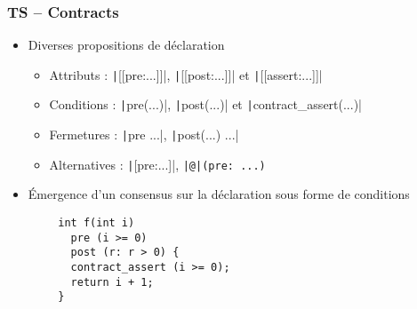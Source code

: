 \documentclass[C++.tex]{subfiles}
\begin{document}
\begin{frame}[fragile]
	\frametitle{TS -- Contracts}
	\begin{itemize}
		\item Diverses propositions de déclaration
		\begin{itemize}
			\item Attributs : \texttt|[[pre:...]]|, \texttt|[[post:...]]| et  \texttt|[[assert:...]]|
			\item Conditions : \texttt|pre(...)|, \texttt|post(...)| et \texttt|contract_assert(...)|
			\item Fermetures : \texttt|pre {...}|, \texttt|post(...) {...}|
			\item Alternatives : \texttt|[{pre:...}]|, \texttt{|@|(pre: ...)}
		\end{itemize}
		\item Émergence d'un consensus sur la déclaration sous forme de conditions
	\end{itemize}

	\begin{verbatim}
		int f(int i)
		  pre (i >= 0)
		  post (r: r > 0) {
		  contract_assert (i >= 0);
		  return i + 1;
		}
	\end{verbatim}


\end{frame}
\end{document}
